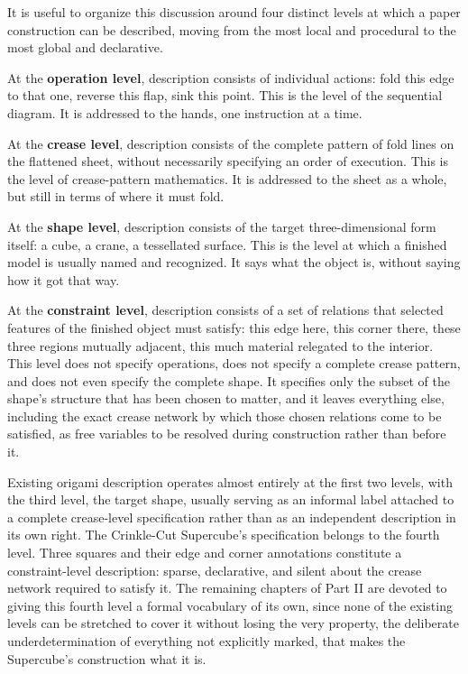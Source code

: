 \documentclass[11pt,oneside]{book}
\begin{document}
It is useful to organize this discussion around four distinct levels at
which a paper construction can be described, moving from the most local
and procedural to the most global and declarative.

At the \textbf{operation level}, description consists of individual
actions: fold this edge to that one, reverse this flap, sink this point.
This is the level of the sequential diagram. It is addressed to the
hands, one instruction at a time.

At the \textbf{crease level}, description consists of the complete
pattern of fold lines on the flattened sheet, without necessarily
specifying an order of execution. This is the level of crease-pattern
mathematics. It is addressed to the sheet as a whole, but still in terms
of where it must fold.

At the \textbf{shape level}, description consists of the target
three-dimensional form itself: a cube, a crane, a tessellated surface.
This is the level at which a finished model is usually named and
recognized. It says what the object is, without saying how it got that
way.

At the \textbf{constraint level}, description consists of a set of
relations that selected features of the finished object must satisfy:
this edge here, this corner there, these three regions mutually
adjacent, this much material relegated to the interior. This level does
not specify operations, does not specify a complete crease pattern, and
does not even specify the complete shape. It specifies only the subset
of the shape's structure that has been chosen to matter, and it leaves
everything else, including the exact crease network by which those
chosen relations come to be satisfied, as free variables to be resolved
during construction rather than before it.

Existing origami description operates almost entirely at the first two
levels, with the third level, the target shape, usually serving as an
informal label attached to a complete crease-level specification rather
than as an independent description in its own right. The Crinkle-Cut
Supercube's specification belongs to the fourth level. Three squares and
their edge and corner annotations constitute a constraint-level
description: sparse, declarative, and silent about the crease network
required to satisfy it. The remaining chapters of Part II are devoted to
giving this fourth level a formal vocabulary of its own, since none of
the existing levels can be stretched to cover it without losing the very
property, the deliberate underdetermination of everything not explicitly
marked, that makes the Supercube's construction what it is.
\end{document}
